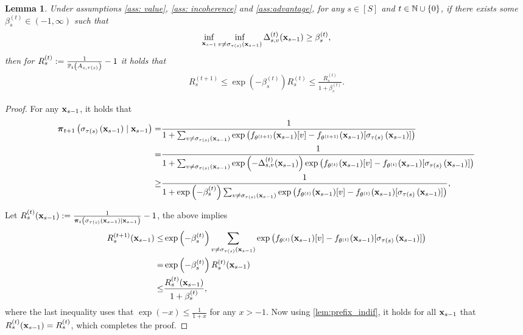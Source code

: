 \documentclass{article}
\theoremstyle{plain}
\newtheorem{lemma}[theorem]{Lemma}
\theoremstyle{definition}
\theoremstyle{remark}
\begin{document}
\begin{lemma}\label{lem: R_t}
    Under assumptions \ref{ass: value}, \ref{ass: incoherence} and \cref{ass:advantage}, for any $s\in[S]$ and $t\in\N\cup\{0\}$, if there exists some $\beta^{(t)}_{s}\in(-1, \infty)$ such that
    \begin{align*}
          \inf_{\bx_{s-1}} \inf_{v\neq \sigma_{\tau(s)}(\bx_{s-1})} \Delta^{(t)}_{s, v}(\bx_{s-1}) \geq \beta^{(t)}_{s},
    \end{align*}
    then for $R^{(t)}_s := \frac{1}{\P_t\left(A_{s, \tau(s)} \right)} - 1$ it holds that
    \begin{align*}
        R^{(t+1)}_s\leq \exp\left(-\beta^{(t)}_s\right) R^{(t)}_s \leq \frac{R^{(t)}_s}{1+ \beta^{(t)}_s}.
    \end{align*}
\end{lemma}
\begin{proof}
    For any $\bx_{s-1}$, it holds that
    \begin{align*}
        \bpi_{t+1}\left(\sigma_{\tau(s)}\left(\bx _{s-1}\right) \mid \bx_{s-1}\right) 
        = & \frac{1}{1 + \sum_{v\neq \sigma_{\tau(s)}\left(\bx _{s-1}\right)} \exp\left(f_{\theta^{(t+1)}}(\bx_{s-1})[v] - f_{\theta^{(t+1)}}(\bx_{s-1})[\sigma_{\tau(s)}\left(\bx _{s-1}\right)]\right)} \\
        = & \frac{1}{1 + \sum_{v\neq \sigma_{\tau(s)}\left(\bx _{s-1}\right)} \exp\left(-\Delta^{(t)}_{s,v}(\bx_{s-1})\right)\exp\left(f_{\theta^{(t)}}(\bx_{s-1})[v] - f_{\theta^{(t)}}(\bx_{s-1})[\sigma_{\tau(s)}\left(\bx _{s-1}\right)]\right)} \\
        \geq & \frac{1}{1 + \exp\left(-\beta_s^{(t)}\right)\sum_{v\neq \sigma_{\tau(s)}\left(\bx _{s-1}\right)} \exp\left(f_{\theta^{(t)}}(\bx_{s-1})[v] - f_{\theta^{(t)}}(\bx_{s-1})[\sigma_{\tau(s)}\left(\bx _{s-1}\right)]\right)}, 
    \end{align*}

    Let $R^{(t)}_s(\bx_{s-1}) := \frac{1}{\bpi_{t}\left(\sigma_{\tau(s)}\left(\bx _{s-1}\right) \mid \bx_{s-1}\right)} - 1$, the above implies
    \begin{align*}
        R^{(t+1)}_s(\bx_{s-1}) 
        \leq & \exp\left(-\beta^{(t)}_s\right) \sum_{v\neq \sigma_{\tau(s)}\left(\bx _{s-1}\right)} \exp\left(f_{\theta^{(t)}}(\bx_{s-1})[v] - f_{\theta^{(t)}}(\bx_{s-1})[\sigma_{\tau(s)}\left(\bx _{s-1}\right)]\right) \\ 
        = & \exp\left(-\beta^{(t)}_s\right) R^{(t)}_s(\bx_{s-1}) \\ 
        \leq & \frac{R^{(t)}_s(\bx_{s-1})}{1+ \beta^{(t)}_s},
    \end{align*}
    where the last inequality uses that $\exp(-x) \leq \frac{1}{1+x}$ for any $x>-1$. 
    Now using \cref{lem:prefix_indif}, it holds for all $\bx_{s-1}$ that $R^{(t)}_s(\bx_{s-1}) = R^{(t)}_s$, which completes the proof.
\end{proof}
\end{document}
